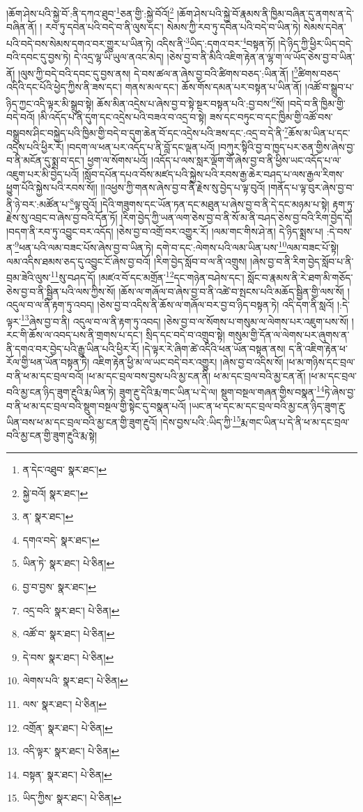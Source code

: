 །ཆོག་ཤེས་པའི་སྐྱེ་བོ་:ནི་དཀའ་ཐུབ་\footnote{ན་དེང་འཐུབ་  སྣར་ཐང་། }ཅན་གྱི་:སྐྱེ་བོའོ།\footnote{སྐྱེ་བའོ།  སྣར་ཐང་། } །ཆོག་ཤེས་པའི་སྐྱེ་བོ་རྣམས་ནི་ཁྱིམ་བཞིན་དུ་ནགས་ན་དེ་བཞིན་ནོ། །
རབ་ཏུ་དབེན་པའི་བདེ་བ་ནི་ལུས་དང་། སེམས་ཀྱི་རབ་ཏུ་དབེན་པའི་བདེ་བ་ཡིན་ཏེ། སེམས་དབེན་པའི་བདེ་བས་སེམས་དགའ་བར་གྱུར་པ་ཡིན་ཏེ། འདིས་ནི་\footnote{ན་  སྣར་ཐང་། }ཡིད་:དགའ་བར་\footnote{དགའ་བདེ་  སྣར་ཐང་། }བསྟན་ཏོ། །དེ་ཉིད་ཀྱི་ཕྱིར་ཡིད་བདེ་བའི་དབང་དུ་བྱས་ཏེ། དེ་འདྲ་ལྷ་ཡི་ཡུལ་ནའང་མེད། །ཅེས་བྱ་བ་ནི་མིའི་འཇིག་རྟེན་ན་ལྷ་ག་ལ་ཡོད་ཅེས་བྱ་བ་ཡིན་ནོ། །ལུས་ཀྱི་བདེ་བའི་དབང་དུ་བྱས་ནས། དེ་བས་ཚལ་ན་ཞེས་བྱ་བའི་ཚིགས་བཅད་:ཡིན་ནོ། །\footnote{ཡིན་ཏེ་  སྣར་ཐང་།  པེ་ཅིན། }ཚིགས་བཅད་འདིའི་དང་པོའི་ཕྱེད་ཀྱིས་ནི་ཟས་དང་། གནས་མལ་དང་། ཆོས་གོས་དམན་པར་བསྟན་པ་ཡིན་ནོ། །འཚོ་བ་སྒྲུབ་པ་ཉིད་ཀྱང་འདི་ལྟར་མི་སྒྲུབ་སྟེ། ཆོས་མིན་འདྲེས་པ་ཞེས་བྱ་བ་སྟེ་སྔར་བསྟན་པའི་:བྱ་བས་\footnote{བྱ་བ་བྱས་  སྣར་ཐང་། }སོ། །བདེ་བ་ནི་ཁྱིམ་གྱི་བདེ་བའོ། །མི་འདོད་པ་ནི་དུག་དང་འདྲེས་པའི་བཟའ་བ་འདྲ་བ་སྟེ། ཟས་དང་བཏུང་བ་དང་ཁྱིམ་གྱི་འཚོ་བས་བསྒྲུབས་ཤིང་བསྐྱེད་པའི་ཁྱིམ་གྱི་བདེ་བ་དུག་ཆེན་བོ་དང་འདྲེས་པའི་ཟས་དང་:འདྲ་བ་དེ་ནི་\footnote{འདྲ་བའི་  སྣར་ཐང་།  པེ་ཅིན། }ཆོས་མ་ཡིན་པ་དང་འདྲེས་པའི་ཕྱིར་རོ། །བདག་ལ་ཕན་པར་འདོད་པ་ནི་བློ་དང་ལྡན་པའོ། །བཀུར་སྟིའི་བྱ་བ་ཁྱད་པར་ཅན་གྱིས་ཞེས་བྱ་བ་ནི་མངོན་དུ་སྨྲ་བ་དང་། ཕྱག་ལ་སོགས་པའོ། །འདོད་པ་ལས་སླར་ལྡོག་གོ་ཞེས་བྱ་བ་ནི་ཕྱིས་ཡང་འདོད་པ་ལ་འཇུག་པར་མི་བྱེད་པའོ། །སློབ་དཔོན་དཔའ་བོས་མཛད་པའི་སྐྱེས་པའི་རབས་རྒྱ་ཆེར་བཤད་པ་ལས་རྒྱལ་རིགས་ཕྱུག་པོའི་སྐྱེས་པའི་རབས་སོ།། །།འཕྱས་ཀྱི་གནས་ཞེས་བྱ་བ་ནི་རྗེས་སུ་བྱེད་པ་ལྟ་བུའོ། །གནོད་པ་ལྟ་བུར་ཞེས་བྱ་བ་ནི་ཉེ་བར་:མཚོན་པ་\footnote{འཚོ་བ་  སྣར་ཐང་།  པེ་ཅིན། }ལྟ་བུའོ། །དེའི་གཟུགས་དང་ཡོན་ཏན་དང་མཐུན་པ་ཞེས་བྱ་བ་ནི་དེ་དང་མཉམ་པ་སྟེ། རྟག་ཏུ་རྗེས་སུ་འབྲང་བ་ཞེས་བྱ་བའི་དོན་ཏོ། །རིག་བྱེད་ཀྱི་ཡན་ལག་ཅེས་བྱ་བ་ནི་སོ་མ་ནི་བཤད་ཅེས་བྱ་བའི་རིག་བྱེད་དོ། །བདག་ནི་རབ་ཏུ་འབྱུང་བར་འདོད། །ཅེས་བྱ་བ་འགྲོ་བར་འགྱུར་རོ། །ལམ་གང་གིས་ཤེ་ན། དེ་ཉིད་སྨྲས་པ། :དེ་བས་ན་\footnote{དེ་བས་  སྣར་ཐང་།  པེ་ཅིན། }ཕན་པའི་ལམ་བཟང་པོས་ཞེས་བྱ་བ་ཡིན་ཏེ། དགེ་བ་དང་:ལེགས་པའི་ལམ་ཡིན་པས་\footnote{ལེགས་པའི་  སྣར་ཐང་།  པེ་ཅིན། }ལམ་བཟང་པོ་སྟེ། ལམ་འདིས་ཐམས་ཅད་དུ་འབྱུང་ངོ་ཞེས་བྱ་བའོ། །རིག་བྱེད་སློབ་བ་ལ་ནི་འགྲུས། །ཞེས་བྱ་བ་ནི་རིག་བྱེད་སློབ་པ་ནི་བྲམ་ཟེའི་ལུས་\footnote{ལས་  སྣར་ཐང་།  པེ་ཅིན། }སུ་བཤད་དོ། །མཛའ་བོ་དང་མགྲོན་\footnote{འགྲོན་  སྣར་ཐང་།  པེ་ཅིན། }དང་གཉེན་བཤེས་དང་། སློང་བ་རྣམས་ནི་རེ་ཐག་མི་གཅོད་ཅེས་བྱ་བ་ནི་སྦྱིན་པའི་ལས་ཀྱིས་སོ། །ཆོས་ལ་གཞོལ་བ་ཞེས་བྱ་བ་ནི་འཚེ་བ་སྤངས་པའི་མཆོད་སྦྱིན་གྱི་ལས་སོ། །འདུལ་བ་ལ་ནི་རྟག་ཏུ་འབད། །ཅེས་བྱ་བ་འདིས་ནི་ཆོས་ལ་གཞོལ་བར་བྱ་བ་ཉིད་བསྟན་ཏེ། འདི་དག་ནི་སླའོ། །:དེ་ལྟར་\footnote{འདི་ལྟར་  སྣར་ཐང་།  པེ་ཅིན། }ཞེས་བྱ་བ་ནི། འདུལ་བ་ལ་ནི་རྟག་ཏུ་འབད། །ཅེས་བྱ་བ་ལ་སོགས་པ་གསུམ་ལ་ལེགས་པར་འཇུག་པས་སོ། །རང་གི་ཆོས་ལ་འབད་པས་ནི་གྲགས་པ་དང་། སྲིད་དང་བདེ་བ་འགྲུབ་སྟེ། གསུམ་གྱི་དོན་ལ་ལེགས་པར་ཞུགས་ན་ནི་དགའ་བར་བྱེད་པའི་རྒྱུ་ཡིན་པའི་ཕྱིར་རོ། །དེ་ལྟར་རེ་ཞིག་ཚེ་འདིའི་ཕན་ཡོན་བསྟན་ནས། ད་ནི་འཇིག་རྟེན་ཕ་རོལ་གྱི་ཕན་ཡོན་བསྟན་ཏེ། འཇིག་རྟེན་ཕྱི་མ་ལ་ཡང་བདེ་བར་འགྱུར། །ཞེས་བྱ་བ་འདིས་སོ། །ཕ་མ་གཉིས་དང་བྲལ་བ་ནི་ཕ་མ་དང་བྲལ་བའོ། །ཕ་མ་དང་བྲལ་བས་བྱས་པའི་མྱ་ངན་ནི། ཕ་མ་དང་བྲལ་བའི་མྱ་ངན་ནོ། །ཕ་མ་དང་བྲལ་བའི་མྱ་ངན་ཉིད་ཟུག་རྔུའི་རྨ་ཡིན་ཏེ། ཟུག་རྔུ་དེའི་རྨ་གང་ཡིན་པ་དེ་ལ། སྡུག་བསྔལ་གཞན་གྱིས་བསྣན་\footnote{བསྟན་  སྣར་ཐང་།  པེ་ཅིན། }ཏེ་ཞེས་བྱ་བ་ནི་ཕ་མ་དང་བྲལ་བའི་སྡུག་བསྔལ་གྱི་སྟེང་དུ་བསྣན་པའོ། །ཡང་ན་ཕ་དང་མ་དང་བྲལ་བའི་མྱ་ངན་ཉིད་ཟུག་རྔུ་ཡིན་བས་ཕ་མ་དང་བྲལ་བའི་མྱ་ངན་གྱི་ཟུག་རྔུའོ། །དེས་བྱས་པའི་:ཡིད་ཀྱི་\footnote{ཡིད་ཀྱིས་  སྣར་ཐང་།  པེ་ཅིན། }རྨ་གང་ཡིན་པ་དེ་ནི་ཕ་མ་དང་བྲལ་བའི་མྱ་ངན་གྱི་ཟུག་རྔུའི་རྨ་སྟེ། 